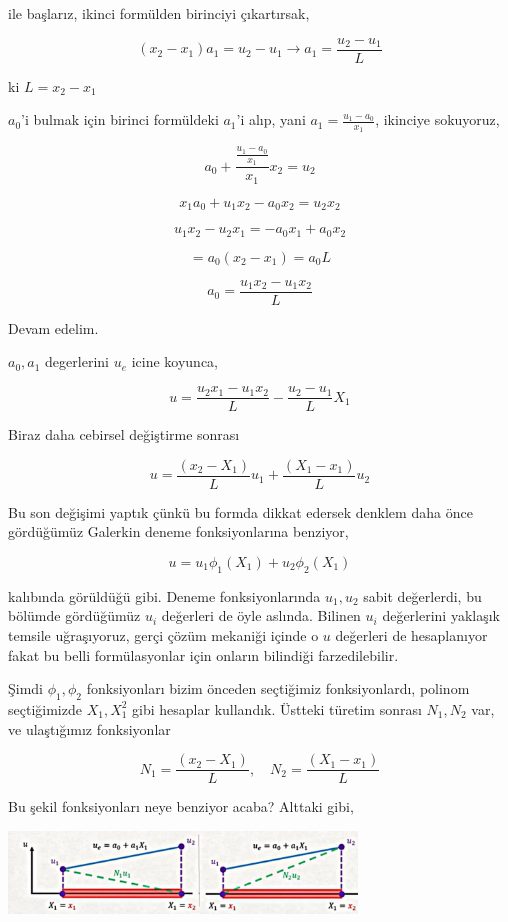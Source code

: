 \documentclass[12pt,fleqn]{article}\usepackage{../../common}
\begin{document}
ile başlarız, ikinci formülden birinciyi çıkartırsak,

$$
(x_2 - x_1) a_1 = u_2 - u_1 \to a_1 = \frac{u_2 - u_1}{L}
$$

ki $L = x_2 - x_1$

$a_0$'i bulmak için birinci formüldeki $a_1$'i alıp, yani
$a_1 = \frac{u_1 - a_0}{x_1}$, ikinciye sokuyoruz,


$$
a_0 + \frac{\frac{u_1 - a_0}{x_1}}{x_1} x_2 = u_2
$$

$$
x_1 a_0 + u_1 x_2 - a_0 x_2 = u_2 x_2
$$

$$
u_1 x_2 - u_2x_1 = -a_0 x_1 + a_0 x_2
$$

$$
= a_0 (x_2 - x_1) = a_0 L
$$

$$
a_0 = \frac{u_1 x_2 - u_1 x_2}{L}
$$

Devam edelim.

$a_0,a_1$ degerlerini $u_e$ icine koyunca,

$$
u = \frac{u_2 x_1 - u_1 x_2}{L} - \frac{u_2 - u_1}{L} X_1
$$

Biraz daha cebirsel değiştirme sonrası

$$
u = \frac{(x_2 - X_1)}{L} u_1 + \frac{(X_1 - x_1)}{L} u_2
$$

Bu son değişimi yaptık çünkü bu formda dikkat edersek denklem daha önce
gördüğümüz Galerkin deneme fonksiyonlarına benziyor,

$$
u = u_1 \phi_1(X_1) + u_2 \phi_2 (X_1)
$$

kalıbında görüldüğü gibi. Deneme fonksiyonlarında $u_1,u_2$ sabit değerlerdi, bu
bölümde gördüğümüz $u_i$ değerleri de öyle aslında. Bilinen $u_i$ değerlerini
yaklaşık temsile uğraşıyoruz, gerçi çözüm mekaniği içinde o $u$ değerleri de
hesaplanıyor fakat bu belli formülasyonlar için onların bilindiği
farzedilebilir.

Şimdi $\phi_1,\phi_2$ fonksiyonları bizim önceden seçtiğimiz fonksiyonlardı,
polinom seçtiğimizde $X_1,X_1^2$ gibi hesaplar kullandık. Üstteki türetim
sonrası $N_1,N_2$ var, ve ulaştığımız fonksiyonlar

$$
N_1 = \frac{(x_2 - X_1)}{L}, \quad N_2 = \frac{(X_1 - x_1)}{L} 
$$

Bu şekil fonksiyonları neye benziyor acaba? Alttaki gibi,

\includegraphics[width=25em]{compscieng_bpp45fem2_08.jpg}
\end{document}
